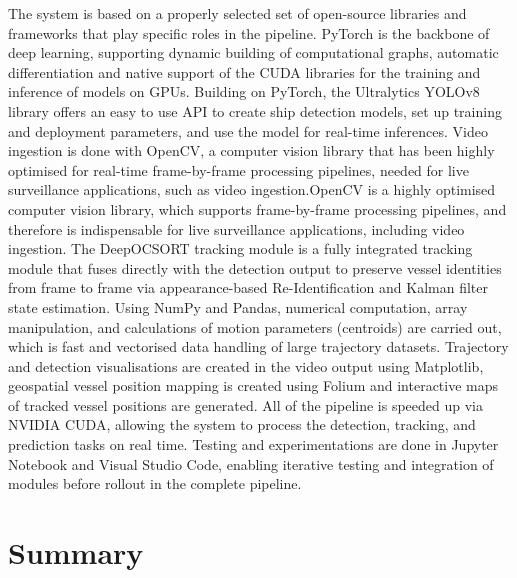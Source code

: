 The system is based on a properly selected set of open-source libraries and frameworks that play specific roles in the pipeline. PyTorch is the backbone of deep learning, supporting dynamic building of computational graphs, automatic differentiation and native support of the CUDA libraries for the training and inference of models on GPUs. Building on PyTorch, the Ultralytics YOLOv8 library offers an easy to use API to create ship detection models, set up training and deployment parameters, and use the model for real-time inferences. Video ingestion is done with OpenCV, a computer vision library that has been highly optimised for real-time frame-by-frame processing pipelines, needed for live surveillance applications, such as video ingestion.OpenCV is a highly optimised computer vision library, which supports frame-by-frame processing pipelines, and therefore is indispensable for live surveillance applications, including video ingestion. 
The DeepOCSORT tracking module is a fully integrated tracking module that fuses directly with the detection output to preserve vessel identities from frame to frame via appearance-based Re-Identification and Kalman filter state estimation. Using NumPy and Pandas, numerical computation, array manipulation, and calculations of motion parameters (centroids) are carried out, which is fast and vectorised data handling of large trajectory datasets. Trajectory and detection visualisations are created in the video output using Matplotlib, geospatial vessel position mapping is created using Folium and interactive maps of tracked vessel positions are generated. All of the pipeline is speeded up via NVIDIA CUDA, allowing the system to process the detection, tracking, and prediction tasks on real time. Testing and experimentations are done in Jupyter Notebook and Visual Studio Code, enabling iterative testing and integration of modules before rollout in the complete pipeline.


\section{Summary}

